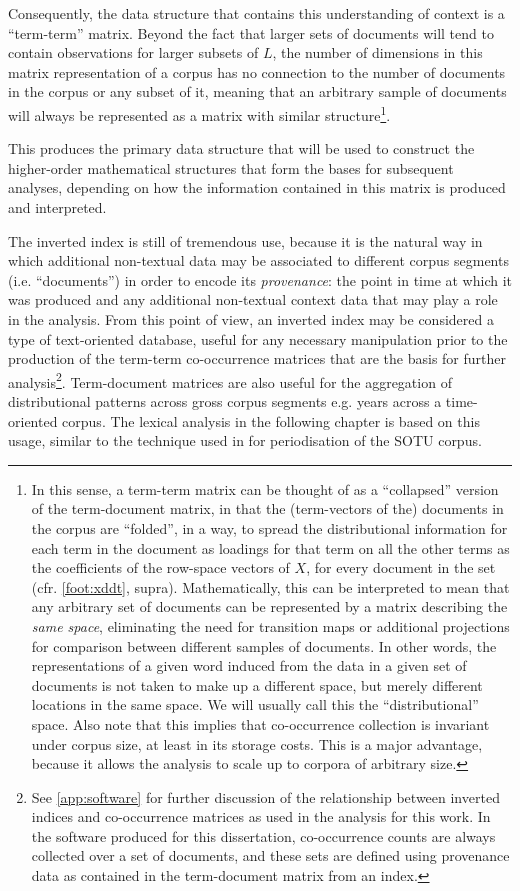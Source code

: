 Consequently, the data structure that contains this understanding of context is a ``term-term'' matrix.
Beyond the fact that larger sets of documents will tend to contain observations for larger subsets of $L$, the number of dimensions in this matrix representation of a corpus has no connection to the number of documents in the corpus or any subset of it, meaning that an arbitrary sample of documents will always be represented as a matrix with similar structure\footnote{
    In this sense, a term-term matrix can be thought of as a ``collapsed'' version of the term-document matrix, in that the (term-vectors of the) documents in the corpus are ``folded'', in a way, to spread the distributional information for each term in the document as loadings for that term on all the other terms as the coefficients of the row-space vectors of $X$, for every document in the set (cfr. \autoref{foot:xddt}, supra).
    Mathematically, this can be interpreted to mean that any arbitrary set of documents can be represented by a matrix describing the \emph{same space}, eliminating the need for transition maps or additional projections for comparison between different samples of documents.
    In other words, the representations of a given word induced from the data in a given set of documents is not taken to make up a different space, but merely different locations in the same space.
    We will usually call this the ``distributional'' space.
    Also note that this implies that co-occurrence collection is invariant under corpus size, at least in its storage costs.
    This is a major advantage, because it allows the analysis to scale up to corpora of arbitrary size.
}.

This produces the primary data structure that will be used to construct the higher-order mathematical structures that form the bases for subsequent analyses, depending on how the information contained in this matrix is produced and interpreted.

The inverted index is still of tremendous use, because it is the natural way in which additional non-textual data may be associated to different corpus segments (i.e. ``documents'') in order to encode its \emph{provenance}: the point in time at which it was produced and any additional non-textual context data that may play a role in the analysis.
From this point of view, an inverted index may be considered a type of text-oriented database, useful for any necessary manipulation prior to the production of the term-term co-occurrence matrices that are the basis for further analysis\footnote{
    See \autoref{app:software} for further discussion of the relationship between inverted indices and co-occurrence matrices as used in the analysis for this work.
    In the software produced for this dissertation, co-occurrence counts are always collected over a set of documents, and these sets are defined using provenance data as contained in the term-document matrix from an index.
}.
Term-document matrices are also useful for the aggregation of distributional patterns across gross corpus segments e.g. years across a time-oriented corpus.
The lexical analysis in the following chapter is based on this usage, similar to the technique used in \citet{rule2015} for periodisation of the SOTU corpus.

